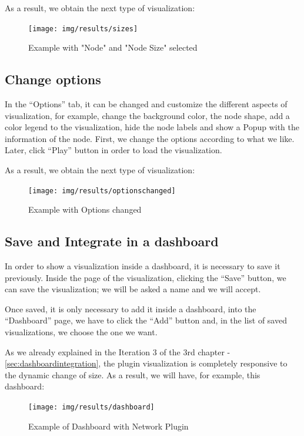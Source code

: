 \documentclass[a4paper, 12pt]{book}
\begin{document}
As a result, we obtain the next type of visualization:

\begin{figure}[H]
  \centering
  \texttt{[image: img/results/sizes]}
  \caption{Example with "Node" and "Node Size" selected}
  \label{fig:sizes}
\end{figure}


\subsection{Change options}

In the “Options” tab, it can be changed and customize the different aspects of visualization, for example, change the background color, the node shape, add a color legend to the visualization, hide the node labels and show a Popup with the information of the node. First, we change the options according to what we like. Later, click “Play” button in order to load the visualization.

As a result, we obtain the next type of visualization:

\begin{figure}[H]
  \centering
  \texttt{[image: img/results/optionschanged]}
  \caption{Example with Options changed}
  \label{fig:optionschanged}
\end{figure}

\subsection{Save and Integrate in a dashboard}

In order to show a visualization inside a dashboard, it is necessary to save it previously. Inside the page of the visualization, clicking the “Save” button, we can save the visualization; we will be asked a name and we will accept.

Once saved, it is only necessary to add it inside a dashboard, into the “Dashboard” page, we have to click the “Add” button and, in the list of saved visualizations, we choose the one we want.

As we already explained in the Iteration 3 of the 3rd chapter - \ref{sec:dashboardintegration}, the plugin visualization is completely responsive to the dynamic change of size. As a result, we will have, for example, this dashboard:

\begin{figure}[H]
  \centering
  \texttt{[image: img/results/dashboard]}
  \caption{Example of Dashboard with Network Plugin}
  \label{fig:dashboard}
\end{figure}
\end{document}
